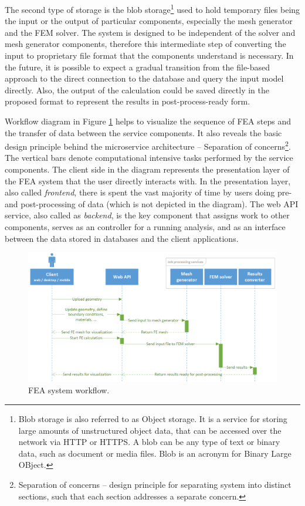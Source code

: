 The second type of storage is the blob storage\footnote{Blob storage is also referred to as Object storage. It is a service for storing large amounts of unstructured object data, that can be accessed over the network via HTTP or HTTPS. A blob can be any type of text or binary data, such as document or media files. Blob is an acronym for Binary Large OBject.} used to hold temporary files being the input or the output of particular components, especially the mesh generator and the FEM solver. The system is designed to be independent of the solver and mesh generator components, therefore this intermediate step of converting the input to proprietary file format that the components understand is necessary. In the future, it is possible to expect a gradual transition from the file-based approach to the direct connection to the database and query the input model directly. Also, the output of the calculation could be saved directly in the proposed format to represent the results in post-process-ready form.

Workflow diagram in Figure \ref{fig:FEA-workflow} helps to visualize the sequence of FEA steps and the transfer of data between the service components. It also reveals the basic design principle behind the microservice architecture -- Separation of concerns\footnote{Separation of concerns -- design principle for separating system into distinct sections, such that each section addresses a separate concern.}. The vertical bars denote computational intensive tasks performed by the service components. The client side in the diagram represents the presentation layer of the FEA system that the user directly interacts with. In the presentation layer, also called \textit{frontend}, there is spent the vast majority of time by users doing pre- and post-processing of data (which is not depicted in the diagram). The web API service, also called as \textit{backend}, is the key component that assigns work to other components, serves as an controller for a running analysis, and as an interface between the data stored in databases and the client applications.

\begin{figure}[H]
    \centering
    \includegraphics[width=\textwidth]{figures/chapter-data-management/FEA-workflow}
    \decoRule
    \caption{FEA system workflow.}
    \label{fig:FEA-workflow}
\end{figure}

